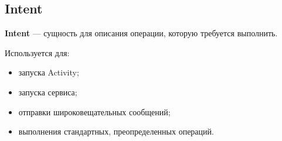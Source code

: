\subsection{Intent}
\textbf{Intent} --- сущность для описания операции, которую требуется выполнить.

Используется для:
\begin{itemize}
	\item запуска Activity;
	\item запуска сервиса;
	\item отправки широковещательных сообщений;
	\item выполнения стандартных, преопределенных операций.
\end{itemize}